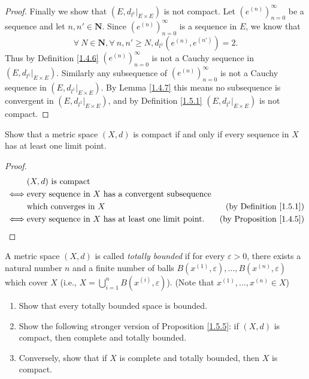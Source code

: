 \begin{proof}
    Finally we show that \((E, d_{l^1}|_{E \times E})\) is not compact.
    Let \((e^{(n)})_{n = 0}^\infty\) be a sequence and let \(n, n' \in \mathbf{N}\).
    Since \((e^{(n)})_{n = 0}^\infty\) is a sequence in \(E\), we know that
    \[
        \forall\ N \in \mathbf{N}, \forall\ n, n' \geq N, d_{l^1}(e^{(n)}, e^{(n')}) = 2.
    \]
    Thus by Definition \ref{1.4.6} \((e^{(n)})_{n = 0}^\infty\) is not a Cauchy sequence in \((E, d_{l^1}|_{E \times E})\).
    Similarly any subsequence of \((e^{(n)})_{n = 0}^\infty\) is not a Cauchy sequence in \((E, d_{l^1}|_{E \times E})\).
    By Lemma \ref{1.4.7} this means no subsequence is convergent in \((E, d_{l^1}|_{E \times E})\), and by Definition \ref{1.5.1} \((E, d_{l^1}|_{E \times E})\) is not compact.
\end{proof}

\begin{exercise}\label{ex 1.5.9}
    Show that a metric space \((X, d)\) is compact if and only if every sequence in \(X\) has at least one limit point.
\end{exercise}

\begin{proof}
    \begin{align*}
             & (X, d) \text{ is compact}                                                                               \\
        \iff & \text{every sequence in } X \text{ has a convergent subsequence}                                        \\
             & \text{which converges in } X                                      & \text{(by Definition \ref{1.5.1})}  \\
        \iff & \text{every sequence in } X \text{ has at least one limit point}. & \text{(by Proposition \ref{1.4.5})}
    \end{align*}
\end{proof}

\begin{exercise}\label{ex 1.5.10}
    A metric space \((X, d)\) is called \emph{totally bounded} if for every \(\varepsilon > 0\), there exists a natural number \(n\) and a finite number of balls \(B(x^{(1)}, \varepsilon), \dots, B(x^{(n)}, \varepsilon)\) which cover \(X\) (i.e., \(X = \bigcup_{i = 1}^n B(x^{(i)}, \varepsilon)\)).
    (Note that \(x^{(1)}, \dots, x^{(n)} \in X\))
    \begin{enumerate}
        \item Show that every totally bounded space is bounded.
        \item Show the following stronger version of Proposition \ref{1.5.5}:
              if \((X, d)\) is compact, then complete and totally bounded.
        \item Conversely, show that if \(X\) is complete and totally bounded, then \(X\) is compact.
    \end{enumerate}
\end{exercise}

